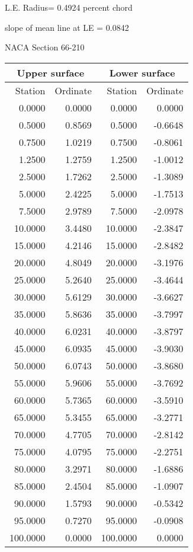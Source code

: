 \documentclass[11pt]{book}
\begin{document}
L.E. Radius=  0.4924 percent chord


 slope of mean line at LE =  0.0842
 \newpage
  \label{s66-210}
 \begin{Large}
 NACA Section 66-210
 \end{Large}
  
 \vspace{8mm}
 \begin{tabular}{|r|r|r|r|} \hline 
 \multicolumn{2}{|c|}{Upper surface} & \multicolumn{2}{|c|}{Lower surface} \\
 \hline
 Station & Ordinate & Station & Ordinate \\
 \hline
0.0000 & 0.0000 & 0.0000 & 0.0000 \\
0.5000 & 0.8569 & 0.5000 & -0.6648 \\
0.7500 & 1.0219 & 0.7500 & -0.8061 \\
1.2500 & 1.2759 & 1.2500 & -1.0012 \\
2.5000 & 1.7262 & 2.5000 & -1.3089 \\
5.0000 & 2.4225 & 5.0000 & -1.7513 \\
7.5000 & 2.9789 & 7.5000 & -2.0978 \\
10.0000 & 3.4480 & 10.0000 & -2.3847 \\
15.0000 & 4.2146 & 15.0000 & -2.8482 \\
20.0000 & 4.8049 & 20.0000 & -3.1976 \\
25.0000 & 5.2640 & 25.0000 & -3.4644 \\
30.0000 & 5.6129 & 30.0000 & -3.6627 \\
35.0000 & 5.8636 & 35.0000 & -3.7997 \\
40.0000 & 6.0231 & 40.0000 & -3.8797 \\
45.0000 & 6.0935 & 45.0000 & -3.9030 \\
50.0000 & 6.0743 & 50.0000 & -3.8680 \\
55.0000 & 5.9606 & 55.0000 & -3.7692 \\
60.0000 & 5.7365 & 60.0000 & -3.5910 \\
65.0000 & 5.3455 & 65.0000 & -3.2771 \\
70.0000 & 4.7705 & 70.0000 & -2.8142 \\
75.0000 & 4.0795 & 75.0000 & -2.2751 \\
80.0000 & 3.2971 & 80.0000 & -1.6886 \\
85.0000 & 2.4504 & 85.0000 & -1.0907 \\
90.0000 & 1.5793 & 90.0000 & -0.5342 \\
95.0000 & 0.7270 & 95.0000 & -0.0908 \\
100.0000 & 0.0000 & 100.0000 & 0.0000 \\
 \hline 
 \end{tabular}
\end{document}
